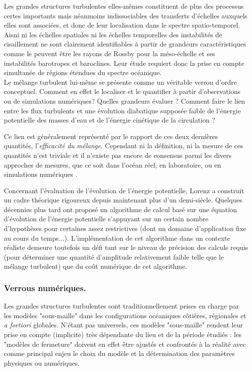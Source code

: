 Les grandes structures turbulentes elles-mêmes constituent de plus des processus certes importants mais néanmoins indissociables des transferts d'échelles auxquels elles sont associées, et donc de leur localisation dans le spectre spatio-temporel. %
Aisni ni les échelles spatiales ni les échelles temporelles des instabilités de cisaillement ne sont clairement identifiables à partir de grandeurs caractéristiques comme le peuvent être les rayons de Rossby pour la méso-échelle et ses instabilités barotropes et baroclines. Leur étude requiert donc la prise en compte simultanée de régions étendues du spectre océanique.\\

Le mélange turbulent lui-même se présente comme un véritable verrou d'ordre conceptuel. Comment en effet le localiser et le quantifier à partir d'observations ou de simulations numériques? Quelles grandeurs évaluer ? 
Comment faire le lien entre les flux turbulents et une évolution diabatique supposée faible de l'énergie potentielle des masses d'eau et de l'énergie cinétique de la circulation ? 

Ce lien est généralement représenté par le rapport de ces deux dernières quantités, l'\textit{efficacité du mélange}. Cependant ni la définition, ni la mesure de ces quantités n'est triviale et il n'existe pas encore de consensus parmi les divers approches de mesures, que ce soit dans l'océan réel, en laboratoire, ou en simulations numériques \citep{gregg_2018}. 

Concernant l'évaluation de l'évolution de l'énergie potentielle, Lorenz \citep{lorenz_available_1955} a construit un cadre théorique rigoureux depuis maintenant plus d'un demi-siècle. Quelques décennies plus tard \cite{winters_available_1995} ont proposé un algorithme de calcul basé sur une équation d'évolution de l'énergie potentielle s'appuyant sur un certain nombre d'hypothèses pour certaines assez restrictives (dont un domaine d'application fixe au cours du temps...). L'implémentation de cet algorithme dans un contexte réaliste demeure toutefois un défi tant sur le niveau de précision des calculs requis (pour déterminer une quantité d'amplitude relativement faible telle que le mélange turbulent) que du coût numérique de cet algorithme.


\subsubsection{Verrous numériques.}
Les grandes structures turbulentes sont traditionnellement prises en charge par les modèles "sous-maille" dans les configurations océaniques côtières, régionales et \textit{a fortiori} globales. N'étant pas universels, ces modèles "sous-maille" rendent leur prise en compte (implicite) très dépendante du lieu et de la période étudiés : les "modèles de fermeture" doivent en effet être ajustés et confrontés à la réalité avec comme principal enjeu le choix du modèle et la détermination des paramètres physiques ou numériques.

